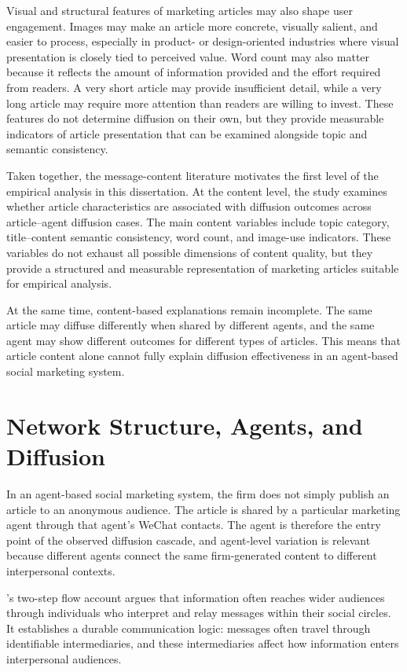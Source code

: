 Visual and structural features of marketing articles may also shape user engagement. Images may make an article more concrete, visually salient, and easier to process, especially in product- or design-oriented industries where visual presentation is closely tied to perceived value. Word count may also matter because it reflects the amount of information provided and the effort required from readers. A very short article may provide insufficient detail, while a very long article may require more attention than readers are willing to invest. These features do not determine diffusion on their own, but they provide measurable indicators of article presentation that can be examined alongside topic and semantic consistency.

Taken together, the message-content literature motivates the first level of the empirical analysis in this dissertation. At the content level, the study examines whether article characteristics are associated with diffusion outcomes across article–agent diffusion cases. The main content variables include topic category, title–content semantic consistency, word count, and image-use indicators. These variables do not exhaust all possible dimensions of content quality, but they provide a structured and measurable representation of marketing articles suitable for empirical analysis.

At the same time, content-based explanations remain incomplete. The same article may diffuse differently when shared by different agents, and the same agent may show different outcomes for different types of articles. This means that article content alone cannot fully explain diffusion effectiveness in an agent-based social marketing system.

\section{Network Structure, Agents, and Diffusion}
\label{sec:2-3-network-structure-agents-and-diffusion}

In an agent-based social marketing system, the firm does not simply publish an article to an anonymous audience. The article is shared by a particular marketing agent through that agent's WeChat contacts. The agent is therefore the entry point of the observed diffusion cascade, and agent-level variation is relevant because different agents connect the same firm-generated content to different interpersonal contexts.

\textcite{katz1955}'s two-step flow account argues that information often reaches wider audiences through individuals who interpret and relay messages within their social circles. It establishes a durable communication logic: messages often travel through identifiable intermediaries, and these intermediaries affect how information enters interpersonal audiences.

